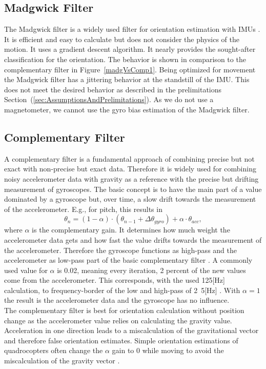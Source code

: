 \documentclass[letterpaper, 10 pt, conference]{ieeeconf}  %
\begin{document}
\subsection{Madgwick Filter}
The Madgwick filter is a widely used filter for orientation estimation with IMUs \cite{madgwick2010}.
It is efficient and easy to calculate but does not consider the physics of the motion.
It uses a gradient descent algorithm.
It nearly provides the sought-after classification for the orientation.
The behavior is shown in comparison to the complementary filter in Figure~\ref{madgVsComp1}.
Being optimized for movement the Madgwick filter has a jittering behavior at the standstill of the IMU.
This does not meet the desired behavior as described in the prelimitations Section~(\ref{sec:AssumptionsAndPrelimitations}).
As we do not use a magnetometer, we cannot use the gyro bias estimation of the Madgwick filter.
\subsection{Complementary Filter}
A complementary filter is a fundamental approach of combining precise but not exact with non-precise but exact data.
Therefore it is widely used for combining noisy accelerometer data with gravity as a reference with the precise but drifting measurement of gyroscopes.
The basic concept is to have the main part of a value dominated by a gyroscope but, over time, a slow drift towards the measurement of the accelerometer.
E.g., for pitch, this results in 
\begin{equation}
\theta_n = (1-\alpha) \cdot (\theta_{n-1}+ \Delta\theta_{gyro})+ \alpha \cdot \theta_{acc},
\end{equation}
where $\alpha$ is the complementary gain. 
It determines how much weight the accelerometer data gets and how fast the value drifts towards the measurement of the accelerometer.
Therefore the gyroscope functions as high-pass and the accelerometer as low-pass part of the basic complementary filter \cite{min2015complementary}.
A commonly used value for $\alpha$ is 0.02, meaning every iteration, 2 percent of the new values come from the accelerometer.
This corresponds, with the used \unit{125}[Hz] calculation, to frequency-border of the low and high-pass  of \unit{2.5}[Hz] \cite{hajdu2017complementary}.
With $\alpha=1$ the result is the accelerometer data and the gyroscope has no influence. \\
The complementary filter is best for orientation calculation without position change as the accelerometer value relies on calculating the gravity value.
Acceleration in one direction leads to a miscalculation of the gravitational vector and therefore false orientation estimates.
Simple orientation estimations of quadrocopters often change the $\alpha$ gain to 0 while moving to avoid the miscalculation of the gravity vector \cite{mahony2005complementary}.
\end{document}
